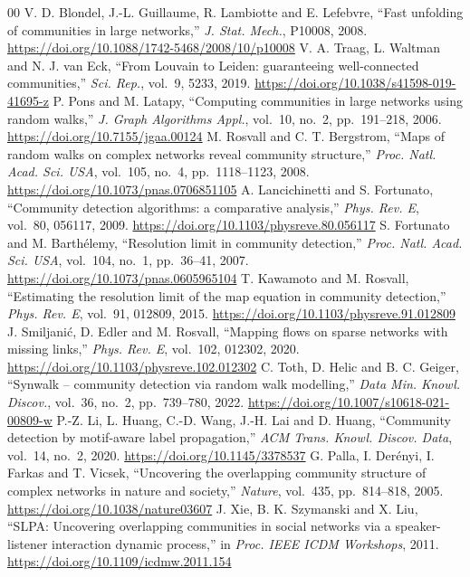\documentclass[conference]{IEEEtran}
\begin{document}
\begin{thebibliography}{00}
 V. D. Blondel, J.-L. Guillaume, R. Lambiotte and E. Lefebvre, ``Fast unfolding of communities in large networks,'' \emph{J. Stat. Mech.}, P10008, 2008. \url{https://doi.org/10.1088/1742-5468/2008/10/p10008}
 V. A. Traag, L. Waltman and N. J. van Eck, ``From Louvain to Leiden: guaranteeing well-connected communities,'' \emph{Sci. Rep.}, vol.~9, 5233, 2019. \url{https://doi.org/10.1038/s41598-019-41695-z}
 P. Pons and M. Latapy, ``Computing communities in large networks using random walks,'' \emph{J. Graph Algorithms Appl.}, vol.~10, no.~2, pp.~191--218, 2006. \url{https://doi.org/10.7155/jgaa.00124}
 M. Rosvall and C. T. Bergstrom, ``Maps of random walks on complex networks reveal community structure,'' \emph{Proc. Natl. Acad. Sci. USA}, vol.~105, no.~4, pp.~1118--1123, 2008. \url{https://doi.org/10.1073/pnas.0706851105}
 A. Lancichinetti and S. Fortunato, ``Community detection algorithms: a comparative analysis,'' \emph{Phys. Rev. E}, vol.~80, 056117, 2009. \url{https://doi.org/10.1103/physreve.80.056117}
 S. Fortunato and M. Barth\'elemy, ``Resolution limit in community detection,'' \emph{Proc. Natl. Acad. Sci. USA}, vol.~104, no.~1, pp.~36--41, 2007. \url{https://doi.org/10.1073/pnas.0605965104}
 T. Kawamoto and M. Rosvall, ``Estimating the resolution limit of the map equation in community detection,'' \emph{Phys. Rev. E}, vol.~91, 012809, 2015. \url{https://doi.org/10.1103/physreve.91.012809}
 J. Smiljani\'c, D. Edler and M. Rosvall, ``Mapping flows on sparse networks with missing links,'' \emph{Phys. Rev. E}, vol.~102, 012302, 2020. \url{https://doi.org/10.1103/physreve.102.012302}
 C. Toth, D. Helic and B. C. Geiger, ``Synwalk -- community detection via random walk modelling,'' \emph{Data Min. Knowl. Discov.}, vol.~36, no.~2, pp.~739--780, 2022. \url{https://doi.org/10.1007/s10618-021-00809-w}
 P.-Z. Li, L. Huang, C.-D. Wang, J.-H. Lai and D. Huang, ``Community detection by motif-aware label propagation,'' \emph{ACM Trans. Knowl. Discov. Data}, vol.~14, no.~2, 2020. \url{https://doi.org/10.1145/3378537}
 G. Palla, I. Der\'enyi, I. Farkas and T. Vicsek, ``Uncovering the overlapping community structure of complex networks in nature and society,'' \emph{Nature}, vol.~435, pp.~814--818, 2005. \url{https://doi.org/10.1038/nature03607}
 J. Xie, B. K. Szymanski and X. Liu, ``SLPA: Uncovering overlapping communities in social networks via a speaker-listener interaction dynamic process,'' in \emph{Proc. IEEE ICDM Workshops}, 2011. \url{https://doi.org/10.1109/icdmw.2011.154}

\end{thebibliography}
\end{document}
